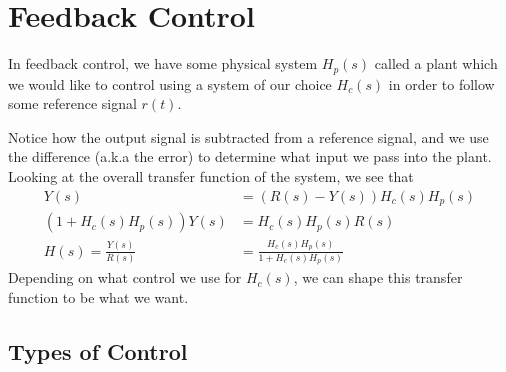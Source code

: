 \section{Feedback Control}
In feedback control, we have some physical system $H_p(s)$ called a plant which we would like to control using a system of our choice $H_c(s)$
in order to follow some reference signal $r(t)$.
\begin{gitbook-image}
\begin{figure}[H]
    \centering
    
\end{figure}
\end{gitbook-image}
Notice how the output signal is subtracted from a reference signal, and we use the difference (a.k.a the error)
to determine what input we pass into the plant. Looking at the overall transfer function of the system, we see that
\begin{align*}
    Y(s) &= (R(s)-Y(s))H_c(s)H_p(s)\\
    (1+H_c(s)H_p(s))Y(s) &= H_c(s)H_p(s)R(s)\\
    H(s) = \frac{Y(s)}{R(s)} &= \frac{H_c(s)H_p(s)}{1+H_c(s)H_p(s)}
\end{align*}
Depending on what control we use for $H_c(s)$, we can shape this transfer function to be what we want.
\subsection{Types of Control}
